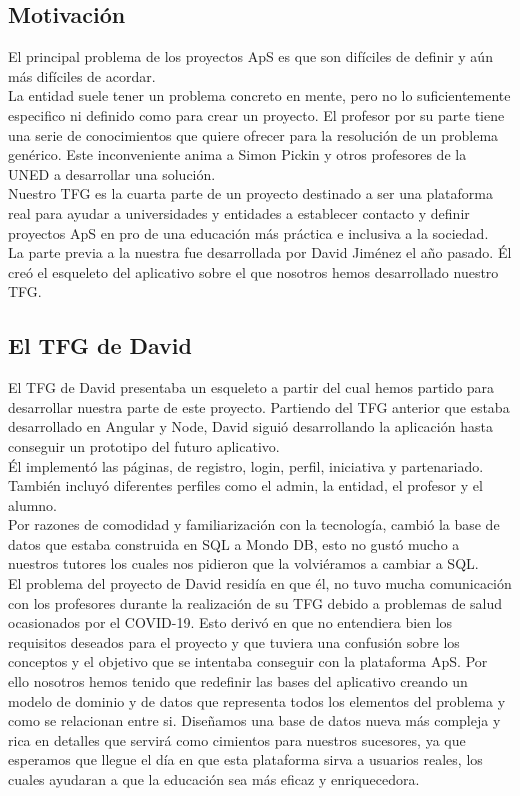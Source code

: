 \documentclass{article}
\begin{document}
\subsection{Motivación}
El principal problema de los proyectos ApS es que son difíciles de definir y aún más difíciles de acordar.\\
La entidad suele tener un problema concreto en mente, pero no lo suficientemente especifico ni definido como para crear un proyecto. El profesor por su parte tiene una serie de conocimientos que quiere ofrecer para la resolución de un problema genérico.
Este inconveniente anima a Simon Pickin y otros profesores de la UNED a desarrollar una solución. \\
Nuestro TFG es la cuarta parte de un proyecto destinado a ser una plataforma real para ayudar a universidades y entidades a establecer contacto y definir proyectos ApS en pro de una educación más práctica e inclusiva a la sociedad.\\
La parte previa a la nuestra fue desarrollada por David Jiménez el año pasado. Él creó el esqueleto del aplicativo sobre el que nosotros hemos desarrollado nuestro TFG.

\subsection{El TFG de David}
El TFG de David presentaba un esqueleto a partir del cual hemos partido para desarrollar nuestra parte de este proyecto. Partiendo del TFG anterior que estaba desarrollado en Angular y Node, David siguió desarrollando la aplicación hasta conseguir un prototipo del futuro aplicativo.\\
Él implementó las páginas, de registro, login, perfil, iniciativa y partenariado. También incluyó diferentes perfiles como el admin, la entidad, el profesor y el alumno.\\
Por razones de comodidad y familiarización con la tecnología, cambió la base de datos que estaba construida en SQL a Mondo DB, esto no gustó mucho a nuestros tutores los cuales nos pidieron que la volviéramos a  cambiar a SQL.\\
El problema del proyecto de David residía en que él, no tuvo mucha comunicación con los profesores durante la realización de su TFG debido a problemas de salud ocasionados por el COVID-19. Esto derivó en que no entendiera bien los requisitos deseados para el proyecto y que tuviera una confusión sobre los conceptos y el objetivo que se intentaba conseguir con la plataforma ApS. Por ello nosotros hemos tenido que redefinir las bases del aplicativo creando un modelo de dominio y de datos que representa todos los elementos del problema y como se relacionan entre si. Diseñamos una base de datos nueva más compleja y rica en detalles que servirá como cimientos para nuestros sucesores, ya que esperamos que llegue el día en que esta plataforma sirva a usuarios reales, los cuales ayudaran a que la educación sea más eficaz y enriquecedora.
\end{document}
